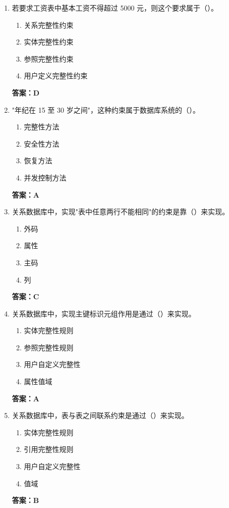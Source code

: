 \documentclass[12pt, a4paper]{article}
\begin{document}
\begin{enumerate}[label=\arabic*.]
	\item 若要求工资表中基本工资不得超过 5000 元，则这个要求属于（\quad）。
	      \begin{enumerate}
		      \item 关系完整性约束
		      \item 实体完整性约束
		      \item 参照完整性约束
		      \item 用户定义完整性约束
	      \end{enumerate}
	      \textbf{答案：D}

	\item "年纪在 15 至 30 岁之间"，这种约束属于数据库系统的（\quad）。
	      \begin{enumerate}
		      \item 完整性方法
		      \item 安全性方法
		      \item 恢复方法
		      \item 并发控制方法
	      \end{enumerate}
	      \textbf{答案：A}

	\item 关系数据库中，实现"表中任意两行不能相同"的约束是靠（\quad）来实现。
	      \begin{enumerate}
		      \item 外码
		      \item 属性
		      \item 主码
		      \item 列
	      \end{enumerate}
	      \textbf{答案：C}

	\item 关系数据库中，实现主键标识元组作用是通过（\quad）来实现。
	      \begin{enumerate}
		      \item 实体完整性规则
		      \item 参照完整性规则
		      \item 用户自定义完整性
		      \item 属性值域
	      \end{enumerate}
	      \textbf{答案：A}

	\item 关系数据库中，表与表之间联系约束是通过（\quad）来实现。
	      \begin{enumerate}
		      \item 实体完整性规则
		      \item 引用完整性规则
		      \item 用户自定义完整性
		      \item 值域
	      \end{enumerate}
	      \textbf{答案：B}


\end{enumerate}
\end{document}
